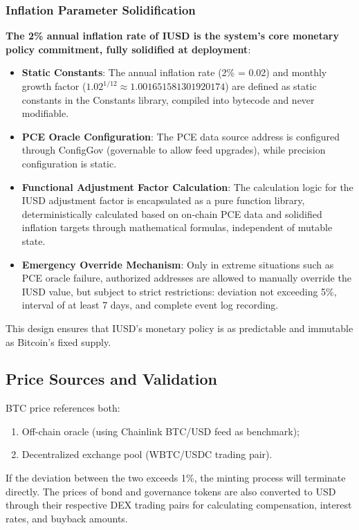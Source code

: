 \documentclass{article}
\begin{document}
\subsubsection{Inflation Parameter Solidification}
\textbf{The 2\% annual inflation rate of IUSD is the system's core monetary policy commitment, fully solidified at deployment}:
\begin{itemize}
  \item \textbf{Static Constants}: The annual inflation rate (2\% = 0.02) and monthly growth factor ($1.02^{1/12} \approx 1.001651581301920174$) are defined as static constants in the Constants library, compiled into bytecode and never modifiable.
  \item \textbf{PCE Oracle Configuration}: The PCE data source address is configured through ConfigGov (governable to allow feed upgrades), while precision configuration is static.
  \item \textbf{Functional Adjustment Factor Calculation}: The calculation logic for the IUSD adjustment factor is encapsulated as a pure function library, deterministically calculated based on on-chain PCE data and solidified inflation targets through mathematical formulas, independent of mutable state.
  \item \textbf{Emergency Override Mechanism}: Only in extreme situations such as PCE oracle failure, authorized addresses are allowed to manually override the IUSD value, but subject to strict restrictions: deviation not exceeding 5\%, interval of at least 7 days, and complete event log recording.
\end{itemize}
This design ensures that IUSD's monetary policy is as predictable and immutable as Bitcoin's fixed supply.

\subsection{Price Sources and Validation}
BTC price references both:
\begin{enumerate}
  \item Off-chain oracle (using Chainlink BTC/USD feed as benchmark);
  \item Decentralized exchange pool (WBTC/USDC trading pair).
\end{enumerate}
If the deviation between the two exceeds 1\%, the minting process will terminate directly. The prices of bond and governance tokens are also converted to USD through their respective DEX trading pairs for calculating compensation, interest rates, and buyback amounts.
\end{document}
